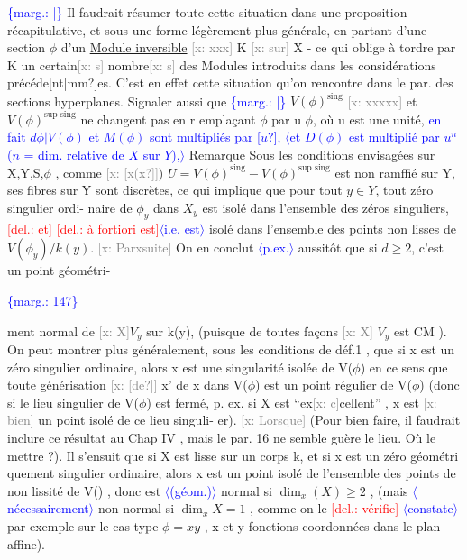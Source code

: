 \documentclass[11pt]{article}
\newcommand{\scanpage}[1]{\par\bigskip\noindent{\small\sffamily[scan #1]}\par}
\newcommand{\mspage}[1]{{\small\sffamily[p.\,#1]}}
\newcommand{\hand}[1]{\textcolor{blue}{#1}}
\let\over\relax
\newcommand{\over}[2]{\textcolor{gray}{#1}\textcolor{blue}{\ensuremath{^{\!\nearrow}}#2}}
\newcommand{\inserted}[2][]{\textcolor{blue}{$\langle$#2$\rangle$}}
\newcommand{\margin}[1]{\textcolor{blue}{\{\textsf{marg.:} #1\}}}
\newcommand{\deleted}[1]{\textcolor{red}{[\textsf{del.:} #1]}}
\newcommand{\xout}[1]{\textcolor{gray}{[\textsf{x:} #1]}}
\newcommand{\uline}[1]{\underline{#1}}
\newcommand{\unsure}[1]{[#1?]}
\begin{document}
\margin{|} Il faudrait résumer  toute cette situation dans une proposition
récapitulative, et sous une forme légèrement plus générale, en partant
d'une section $\phi$ d'un \uline{Module inversible} \xout{xxx} K \xout{sur} X - ce qui oblige
à tordre par K un certain\xout{s} nombre\xout{s} des Modules introduits dans les
considérations précéde\unsure{nt|mm}es. C'est en effet  cette situation qu'on
rencontre  dans le par. des sections hyperplanes. Signaler aussi que
\margin{|} $V(\phi)^{\text{sing}}$ \xout{xxxxx} et $V(\phi)^{\text{sup sing}}$ ne changent pas en r emplaçant $\phi$ par u $\phi$,
où u est une unité, \hand{en fait $d\phi|V(\phi)$ et $M(\phi)$ sont multipliés par \unsure{$u$},}
\inserted{et $D(\phi)$ est multiplié par $u^n$ ($n$ = dim. relative de $X$ sur $Y$),}
\uline{Remarque} Sous les conditions envisagées sur X,Y,S,$\phi$ , comme \xout{\unsure{x(x}})
$U = V(\phi)^{\text{sing}}- V(\phi)^{\text{sup sing}}$ est non ramffié sur Y, ses fibres sur Y sont
discrètes, ce qui implique que pour tout $y\in Y$, tout zéro singulier ordi-%
naire de $\phi_y$ dans $X_y$ est isolé dans l'ensemble des zéros singuliers, \deleted{et}
\deleted{à fortiori est}\inserted{i.e. est} isolé dans l'ensemble des points non lisses de $V(\phi_y)/k(y)$.
\xout{Parxsuite} On en conclut \inserted{p.ex.} aussitôt que si $d\geqslant 2$, c'est un point géométri-%

\margin{147}

\clearpage
\scanpage{25/148}
\mspage{\hand{9}}

ment normal de \xout{X}$V_y$ sur k(y), (puisque de toutes façons \xout{X}  $V_y$ est CM ).
On peut montrer  plus généralement, sous les conditions de déf.1 , que si
x est un zéro singulier ordinaire, alors x est une singularité isolée
de V($\phi$)  en ce sens que toute générisation \xout{\unsure{de}} x' de x dans V($\phi$) est un
point régulier de V($\phi$)  (donc si le lieu singulier de V($\phi$) est fermé, p.
ex. si X est ``ex\xout{c}cellent'' , x est \xout{bien} un point isolé de ce lieu singuli-%
er). \xout{Lorsque} (Pour bien faire, il faudrait inclure ce résultat au Chap
IV , mais  le par. 16 ne semble guère le lieu. Où le mettre ?).  Il
s'ensuit que si X est lisse sur un corps k, et si x est un zéro géométri%
quement singulier ordinaire, alors  x est un point isolé de l'ensemble
des points de non lissité  de V(\over{\unsure{4}}{$\phi$}) , donc est \inserted{(géom.)} normal si  $\dim_x(X) \geqslant 2$ ,
(mais \inserted[typed]{nécessairement} non normal si $\dim_x X = 1$ , comme on le \deleted{vérifie} \inserted{constate} par exemple sur
le cas type $\phi = xy$ , x et y fonctions coordonnées dans le plan affine).
\end{document}
